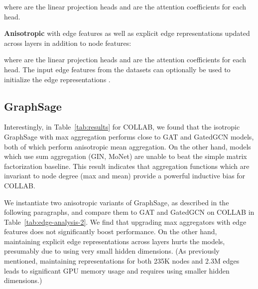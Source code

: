 \documentclass{article}
\begin{document}
where  are the  linear projection heads and  are the attention coefficients for each head.


\textbf{Anisotropic} with edge features as well as explicit edge representations updated across layers in addition to node features:

where  are the  linear projection heads and  are the attention coefficients for each head.
The input edge features from the datasets can optionally be used to initialize the edge representations .


\subsection{GraphSage}

Interestingly, in Table~\ref{tab:results} for COLLAB, we found that the isotropic GraphSage with max aggregation performs close to GAT and GatedGCN models, both of which perform anisotropic mean aggregation.
On the other hand, models which use sum aggregation (GIN, MoNet) are unable to beat the simple matrix factorization baseline.
This result indicates that aggregation functions which are invariant to node degree (max and mean) provide a powerful inductive bias for COLLAB.

We instantiate two anisotropic variants of GraphSage, as described in the following paragraphs, and compare them to GAT and GatedGCN on COLLAB in Table~\ref{tab:edge-analysis-2}.
We find that upgrading max aggregators with edge features does not significantly boost performance. 
On the other hand, maintaining explicit edge representations across layers hurts the models, presumably due to using very small hidden dimensions.
(As previously mentioned, maintaining representations for both 235K nodes and 2.3M edges leads to significant GPU memory usage and requires using smaller hidden dimensions.)
\end{document}
